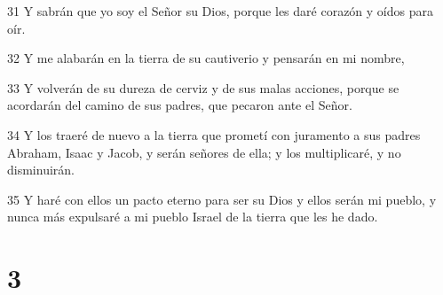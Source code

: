 \par 31 Y sabrán que yo soy el Señor su Dios, porque les daré corazón y oídos para oír.
\par 32 Y me alabarán en la tierra de su cautiverio y pensarán en mi nombre,
\par 33 Y volverán de su dureza de cerviz y de sus malas acciones, porque se acordarán del camino de sus padres, que pecaron ante el Señor.
\par 34 Y los traeré de nuevo a la tierra que prometí con juramento a sus padres Abraham, Isaac y Jacob, y serán señores de ella; y los multiplicaré, y no disminuirán.
\par 35 Y haré con ellos un pacto eterno para ser su Dios y ellos serán mi pueblo, y nunca más expulsaré a mi pueblo Israel de la tierra que les he dado.

\chapter{3}

